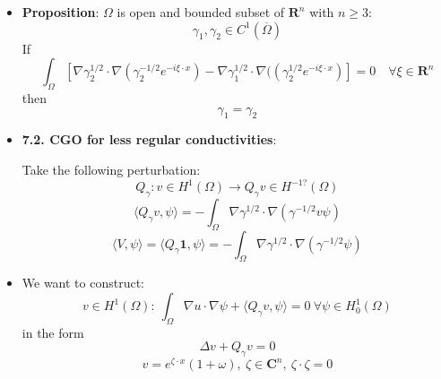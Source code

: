 \documentclass{article}
\begin{document}
\begin{itemize}
    \item \textbf{Proposition}: $\Omega$ is open and bounded subset of $\mathbf{R}^n$ with $n\geq 3$:
    \begin{equation}
        \gamma_1, \gamma_2 \in C^1(\overline{\Omega})
    \end{equation}
    If
    \begin{equation}
        \int_\Omega [\nabla \gamma^{1/2}_2\cdot \nabla (\gamma^{-1/2}_2 e^{-i\xi \cdot x}) - \nabla \gamma^{1/2}_1 \cdot \nabla ((\gamma^{1/2}_2 e^{-i\xi \cdot x})] = 0 \quad \forall \xi \in \mathbf{R}^n
    \end{equation}
    then
    \begin{equation}
        \gamma_1 = \gamma_2
    \end{equation}

    \item \textbf{7.2. CGO for less regular conductivities}:

    Take the following perturbation:
    \begin{equation}
        Q_\gamma : v \in H^1(\Omega) \rightarrow Q_\gamma v \in H^{-1?}(\Omega)
    \end{equation}
    \begin{equation}
        \langle Q_\gamma v, \psi \rangle = - \int_\Omega \nabla \gamma^{1/2} \cdot \nabla (\gamma^{-1/2} v \psi)
    \end{equation}
    \begin{equation}
        \langle V, \psi \rangle = \langle Q_\gamma \mathbf{1}, \psi \rangle = - \int_\Omega \nabla \gamma^{1/2} \cdot \nabla (\gamma^{-1/2} \psi) 
    \end{equation}

    \item We want to construct:
    \begin{equation}
        v \in H^1(\Omega): \ \int_\Omega \nabla u \cdot \nabla \psi + \langle Q_\gamma v, \psi \rangle = 0 \ \forall \psi \in H_0^1(\Omega)
    \end{equation}
    in the form
    \begin{equation}
        \Delta v + Q_\gamma v= 0
    \end{equation}
    \begin{equation}
        v = e^{\zeta \cdot x} (1+\omega), \ \zeta \in \mathbf{C}^n, \ \zeta \cdot \zeta = 0
    \end{equation}


\end{itemize}
\end{document}
